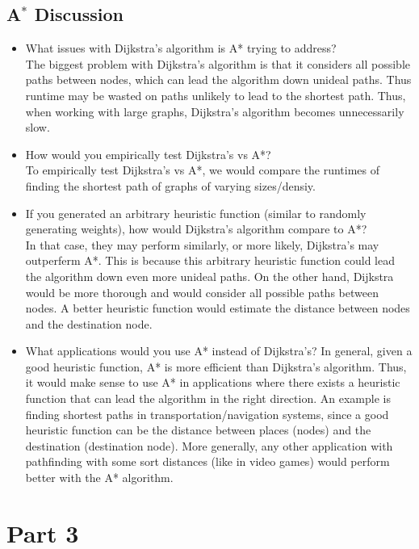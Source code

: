 \documentclass{article}
\begin{document}
\subsection{A$^{*}$ Discussion}
\begin{itemize}
    \item What issues with Dijkstra’s algorithm is A* trying to address?\\
        The biggest problem with Dijkstra’s algorithm is that it considers all possible paths between nodes, which can lead the algorithm down unideal paths. Thus runtime may be wasted on paths unlikely to lead to the shortest path. 
        Thus, when working with large graphs, Dijkstra’s algorithm becomes unnecessarily slow. 
    \item How would you empirically test Dijkstra’s vs A*?\\
        To empirically test Dijkstra’s vs A*, we would compare the runtimes of finding the shortest path of graphs of varying sizes/densiy. 
    \item If you generated an arbitrary heuristic function (similar to randomly generating weights), how would Dijkstra’s algorithm compare to A*?\\
        In that case, they may perform similarly, or more likely, Dijkstra’s may outperferm A*. This is because this arbitrary heuristic function could lead the algorithm down even more unideal paths. On the other hand, Dijkstra would be more thorough and would consider all possible paths between nodes. A better heuristic function would estimate the distance between nodes and the destination node. 
    \item What applications would you use A* instead of Dijkstra’s?
        In general, given a good heuristic function, A* is more efficient than Dijkstra’s algorithm. Thus, it would make sense to use A* in applications where there exists a heuristic function that can lead the algorithm in the right direction. 
        An example is finding shortest paths in transportation/navigation systems, since a good heuristic function can be the distance between places (nodes) and the destination (destination node). More generally, any other application with pathfinding with some sort distances (like in video games) would perform better with the A* algorithm. 

\end{itemize}


\newpage
\section{Part 3}
\end{document}
